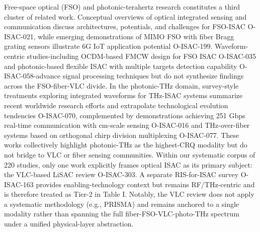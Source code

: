 {} Free-space optical (FSO) and photonic-terahertz research constitutes a third cluster of related work. Conceptual overviews of optical integrated sensing and communication discuss architectures, potentials, and challenges for FSO-ISAC O-ISAC-021, while emerging demonstrations of MIMO FSO with fiber Bragg grating sensors illustrate 6G IoT application potential O-ISAC-199. Waveform-centric studies-including OCDM-based FMCW design for FSO ISAC O-ISAC-035 and photonic-based flexible ISAC with multiple targets detection capability O-ISAC-058-advance signal processing techniques but do not synthesize findings across the FSO-fiber-VLC divide. In the photonic-THz domain, survey-style treatments exploring integrated waveforms for THz-ISAC systems summarize recent worldwide research efforts and extrapolate technological evolution tendencies O-ISAC-070, complemented by demonstrations achieving 251 Gbps real-time communication with cm-scale sensing O-ISAC-016 and THz-over-fiber systems based on orthogonal chirp division multiplexing O-ISAC-077. These works collectively highlight photonic-THz as the highest-CRQ\markdownRendererInlineMath{_{\Delta}} modality but do not bridge to VLC or fiber sensing communities.\markdownRendererParagraphSeparator
{} Within our systematic corpus of 220 studies, only one work explicitly frames optical ISAC as its primary subject: the VLC-based LiSAC review O-ISAC-303. A separate RIS-for-ISAC survey O-ISAC-163 provides enabling-technology context but remains RF/THz-centric and is therefore treated as Tier-2 in Table I. Notably, the VLC review does not apply a systematic methodology (e.g., PRISMA) and remains anchored to a single modality rather than spanning the full fiber-FSO-VLC-photo-THz spectrum under a unified physical-layer abstraction.\markdownRendererParagraphSeparator
